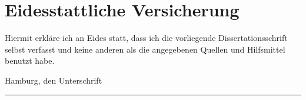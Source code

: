 \chapter*{Eidesstattliche Versicherung} 

Hiermit erkl\"are ich an Eides statt, dass ich die vorliegende Dissertationsschrift selbst
verfasst und keine anderen als die angegebenen Quellen und Hilfsmittel benutzt habe.

\vspace{150pt}
\noindent Hamburg, den \hfill Unterschrift

\vspace{30pt}
\noindent \rule{\textwidth}{0.5pt}